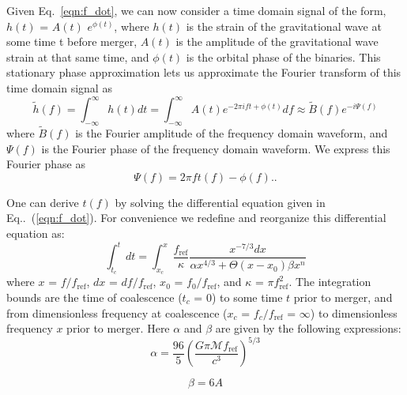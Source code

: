 Given Eq.~\ref{eqn:f_dot}, we can now consider a time domain signal of the form, $h(t)$ = $A(t)$ $e^{\phi(t)}$, where $h(t)$ is the strain of the gravitational wave at some time t before merger, $A(t)$ is the amplitude of the gravitational wave strain at that same time, and $\phi(t)$ is the orbital phase of the binaries\cite{maggiore2008gravitational}. This stationary phase approximation lets us approximate the Fourier transform of this time domain signal as
\begin{equation}\label{eqn:SPA}
\tilde{h}(f) = \int_{-\infty}^{\infty} h(t) dt = \int_{-\infty}^{\infty} A(t) e^{-2\pi i ft + \phi(t)} df \approx \tilde{B}(f) e^{-i\Psi(f)}
\end{equation}
where $\tilde{B}(f)$ is the Fourier amplitude of the frequency domain waveform, and $\Psi(f)$ is the Fourier phase of the frequency domain waveform. We express this Fourier phase as 
\begin{equation}\label{eqn:SPA_Phase}
\Psi(f) = 2\pi f t(f) - \phi(f)..
\end{equation}

One can derive $t(f)$ by solving the differential equation given in Eq..~(\ref{eqn:f_dot}). For convenience we redefine and reorganize this differential equation as:
\begin{equation}\label{eqn:unitless_f_dot}
\int_{t_c}^t dt = \int_{x_c}^{x}  \frac{f_{\mathrm{ref}}}{\kappa} \frac{x^{-7/3} dx}{\alpha x^{4/3} +  \Theta(x - x_0) \beta x^n}
\end{equation}
where $x$ = $f / f_{\mathrm{ref}}$, $dx$ = $df / f_{\mathrm{ref}}$, $x_0$ = $f_0 / f_{\mathrm{ref}}$, and $\kappa$ = $\pi f_{\mathrm{ref}}^2$. The integration bounds are the time of coalescence ($t_c$ = 0) to some time $t$ prior to merger, and from dimensionless frequency at coalescence ($x_c$ = $f_c / f_{\mathrm{ref}}$ = $\infty$) to dimensionless frequency $x$ prior to merger. Here $\alpha$ and $\beta$ are given by the following expressions:
\begin{equation}
\alpha = \frac{96}{5} \left ( \frac{G \pi \mathcal{M} f_{\mathrm{ref}}}{c^3} \right )^{5/3}
\end{equation}

\begin{equation}
\beta = 6 A
\end{equation}

